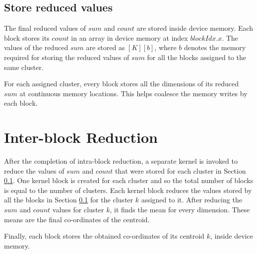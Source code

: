 \subsection{Store reduced values}\label{sec:storeReduced}
The final reduced values of $sum$ and $count$ are stored inside device memory. Each block stores its $count$ in an array in device memory at index $blockIdx.x$. The values of the reduced $sum$ are stored as $[K][b]$, where $b$ denotes the memory required for storing the reduced values of $sum$ for all the blocks assigned to the same cluster.

For each assigned cluster, every block stores all the dimensions of its reduced $sum$ at continuous memory locations. This helps coalesce the memory writes by each block.

\section{Inter-block Reduction}
After the completion of intra-block reduction, a separate kernel is invoked to reduce the values of $sum$ and $count$ that were stored for each cluster in Section \ref{sec:storeReduced}. One kernel block is created for each cluster and so the total number of blocks is equal to the number of clusters. Each kernel block reduces the values stored by all the blocks in Section \ref{sec:storeReduced} for the cluster $k$ assigned to it.
After reducing the $sum$ and $count$ values for cluster $k$, it finds the mean for every dimension. These means are the final co-ordinates of the centroid. 

Finally, each block stores the obtained co-ordinates of its centroid $k$, inside device memory.
